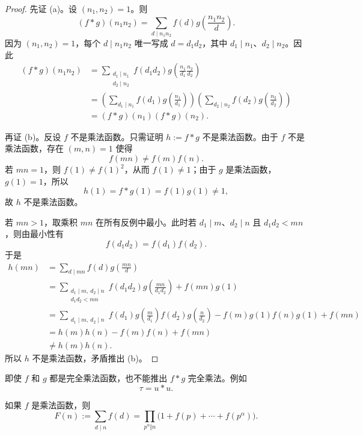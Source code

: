 \begin{proof}
	先证 (a)。设 $(n_1,n_2)=1$。则
	\[
		(f*g)(n_1n_2)
		=
		\sum_{d\mid n_1n_2}f(d)g\left(\frac{n_1n_2}{d}\right).
	\]
	因为 $(n_1,n_2)=1$，每个 $d\mid n_1n_2$ 唯一写成 $d=d_1d_2$，其中 $d_1\mid n_1$、$d_2\mid n_2$。因此
	\begin{align*}
		(f*g)(n_1n_2)
		&=
		\sum_{\substack{d_1\mid n_1\\ d_2\mid n_2}}
		f(d_1d_2)g\left(\frac{n_1}{d_1}\frac{n_2}{d_2}\right)\\
		&=
		\left(\sum_{d_1\mid n_1}f(d_1)g\left(\frac{n_1}{d_1}\right)\right)
		\left(\sum_{d_2\mid n_2}f(d_2)g\left(\frac{n_2}{d_2}\right)\right)\\
		&=(f*g)(n_1)(f*g)(n_2).
	\end{align*}

	再证 (b)。反设 $f$ 不是乘法函数。只需证明 $h:=f*g$ 不是乘法函数。由于 $f$ 不是乘法函数，存在 $(m,n)=1$ 使得
	\[
		f(mn)\neq f(m)f(n).
	\]
	若 $mn=1$，则 $f(1)\neq f(1)^2$，从而 $f(1)\neq 1$；由于 $g$ 是乘法函数，$g(1)=1$，所以
	\[
		h(1)=f*g(1)=f(1)g(1)\neq 1,
	\]
	故 $h$ 不是乘法函数。

	若 $mn>1$，取乘积 $mn$ 在所有反例中最小。此时若 $d_1\mid m$、$d_2\mid n$ 且 $d_1d_2<mn$，则由最小性有
	\[
		f(d_1d_2)=f(d_1)f(d_2).
	\]
	于是
	\begin{align*}
		h(mn)
		&=
		\sum_{d\mid mn}f(d)g\left(\frac{mn}{d}\right)\\
		&=
		\sum_{\substack{d_1\mid m,\ d_2\mid n\\ d_1d_2<mn}}
		f(d_1d_2)
		g\left(\frac{mn}{d_1d_2}\right)
		+
		f(mn)g(1)\\
		&=
		\sum_{\substack{d_1\mid m,\ d_2\mid n}}
		f(d_1)g\left(\frac m{d_1}\right)
		f(d_2)g\left(\frac n{d_2}\right)
		-
		f(m)g(1)f(n)g(1)
		+
		f(mn)\\
		&=
		h(m)h(n)-f(m)f(n)+f(mn)\\
		&\neq h(m)h(n).
	\end{align*}
	所以 $h$ 不是乘法函数，矛盾推出 (b)。
\end{proof}

\begin{remark}
	即使 $f$ 和 $g$ 都是完全乘法函数，也不能推出 $f*g$ 完全乘法。例如
	\[
		\tau=u*u.
	\]
\end{remark}

\begin{corollary}
	如果 $f$ 是乘法函数，则
	\[
		F(n):=\sum_{d\mid n}f(d)
		=
		\prod_{p^\alpha\Vert n}\bigl(1+f(p)+\cdots+f(p^\alpha)\bigr).
	\]
\end{corollary}

